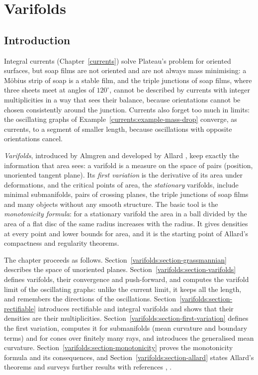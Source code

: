 \chapter{Varifolds}\label{varifolds}

\section{Introduction}\label{varifolds:section-introduction}

Integral currents (Chapter~\ref{currents}) solve Plateau's problem for oriented surfaces, but soap films are not oriented and are not always mass minimising: a M\"obius strip of soap is a stable
film, and the triple junctions of soap films, where three sheets meet at angles of $120^\circ$, cannot be described by currents with integer multiplicities in a way that sees their balance, because
orientations cannot be chosen consistently around the junction. Currents also forget too much in limits: the oscillating graphs of Example~\ref{currents:example-mass-drop} converge, as currents, to a
segment of smaller length, because oscillations with opposite orientations cancel.

\emph{Varifolds}, introduced by Almgren and developed by Allard \cite{allard-1972}, keep exactly the information that area sees: a varifold is a measure on the space of pairs (position, unoriented
tangent plane). Its \emph{first variation} is the derivative of its area under deformations, and the critical points of area, the \emph{stationary} varifolds, include minimal submanifolds, pairs of
crossing planes, the triple junctions of soap films and many objects without any smooth structure. The basic tool is the \emph{monotonicity formula}: for a stationary varifold the area in a ball
divided by the area of a flat disc of the same radius increases with the radius. It gives densities at every point and lower bounds for area, and it is the starting point of Allard's compactness and
regularity theorems.

The chapter proceeds as follows. Section~\ref{varifolds:section-grassmannian} describes the space of unoriented planes. Section~\ref{varifolds:section-varifolds} defines varifolds, their convergence and
push-forward, and computes the varifold limit of the oscillating graphs: unlike the current limit, it keeps all the length, and remembers the directions of the oscillations.
Section~\ref{varifolds:section-rectifiable} introduces rectifiable and integral varifolds and shows that their densities are their multiplicities. Section~\ref{varifolds:section-first-variation} defines
the first variation, computes it for submanifolds (mean curvature and boundary terms) and for cones over finitely many rays, and introduces the generalised mean curvature.
Section~\ref{varifolds:section-monotonicity} proves the monotonicity formula and its consequences, and Section~\ref{varifolds:section-allard} states Allard's theorems and surveys further results with
references \cite{allard-1972}, \cite{simon-gmt}.

